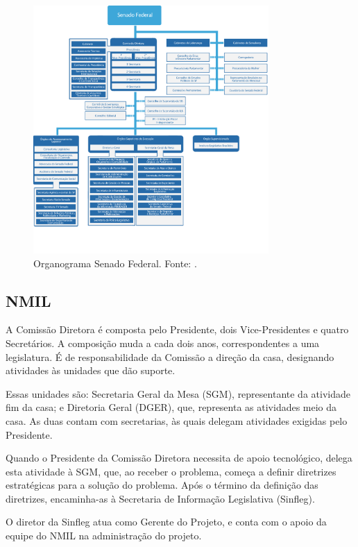 \begin{figure}[H]
	\centering
	\includegraphics[width=0.8\textwidth]{figuras/organograma_senado.png}
	\caption{Organograma Senado Federal. Fonte: \cite{organograma_senado}.}
	\label{img:organograma_senado}
\end{figure}

\subsection{NMIL}

A Comissão Diretora é composta pelo Presidente, dois Vice-Presidentes e quatro
Secretários. A composição muda a cada dois anos, correspondentes a uma legislatura. É de responsabilidade da Comissão a direção da casa, designando atividades às unidades que dão suporte.

Essas unidades são: Secretaria Geral da Mesa (SGM), representante da atividade fim da casa; e Diretoria Geral (DGER), que, representa as atividades meio da casa. As duas contam com secretarias, às quais delegam atividades exigidas pelo Presidente.

Quando o Presidente da Comissão Diretora necessita de apoio tecnológico, delega esta
atividade à SGM, que, ao receber o problema, começa a definir diretrizes estratégicas para a solução do problema. Após o término da definição das diretrizes, encaminha-as à Secretaria de Informação Legislativa (Sinfleg).

O diretor da Sinfleg atua como Gerente do Projeto, e conta com o apoio da equipe do
NMIL na administração do projeto.

